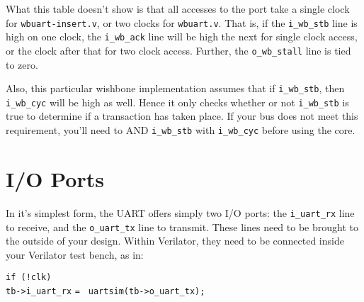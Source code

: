 \documentclass{gqtekspec}
\begin{document}
What this table doesn't show is that all accesses to the port take a single
clock for {\tt wbuart-insert.v}, or two clocks for {\tt wbuart.v}.  That is, if
the {\tt i\_wb\_stb} line is high on one clock, the {\tt i\_wb\_ack} line will
be high the next for single clock access, or the clock after that for two
clock access.  Further, the {\tt o\_wb\_stall} line is tied to zero. 

Also, this particular wishbone implementation assumes that if {\tt i\_wb\_stb},
then {\tt i\_wb\_cyc} will be high as well.  Hence it only checks whether or not
{\tt i\_wb\_stb} is true to determine if a transaction has taken place.  If your
bus does not meet this requirement, you'll need to AND {\tt i\_wb\_stb} with
{\tt i\_wb\_cyc} before using the core.

\chapter{I/O Ports}\label{ch:ioports}

In it's simplest form, the UART offers simply two I/O ports: the
{\tt i\_uart\_rx} line to receive, and the {\tt o\_uart\_tx} line to transmit.
These lines need to be brought to the outside of your design.  Within
Verilator, they need to be connected inside your Verilator test bench, as in:
\begin{tabbing}
{\tt if (!clk)} \= \\
\> {\tt tb->i\_uart\_rx} {\tt = } {\tt uartsim(tb->o\_uart\_tx);}
\end{tabbing}
\end{document}

